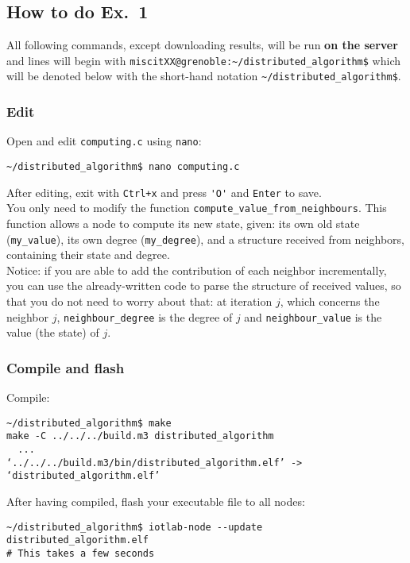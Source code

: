 \documentclass[oneside]{article}
\begin{document}
\subsection{How to do Ex.~1}
All following commands, except downloading results,  will be run \textbf{on the server} and lines will begin with
\verb=miscitXX@grenoble:~/distributed_algorithm$= 
which will be denoted below with the short-hand notation
\verb=~/distributed_algorithm$=.


\subsubsection{Edit} %
Open and edit \verb=computing.c= using \verb=nano=:
\begin{verbatim}~/distributed_algorithm$ nano computing.c \end{verbatim}
After editing, exit with \verb=Ctrl+x= and  press \verb='O'= and \verb=Enter= to save.\\
    

You only need to modify the function \verb=compute_value_from_neighbours=.
This function allows a node to compute its new state, given: 
its own old state (\verb=my_value=),
its own degree (\verb=my_degree=), 
and a structure received from neighbors,
containing their state and degree.\\
Notice: if you are able to add the
contribution of each neighbor incrementally, you can use the
already-written code to parse the structure of received values, so that
you do not need to worry about that: at iteration $j$, which concerns
the neighbor $j$, 
\verb=neighbour_degree= is the degree of $j$ and
\verb=neighbour_value= is the value (the state) of $j$.
    

            
\subsubsection{Compile and flash}

Compile:
    \begin{verbatim}~/distributed_algorithm$ make
make -C ../../../build.m3 distributed_algorithm
  ...
‘../../../build.m3/bin/distributed_algorithm.elf’ -> ‘distributed_algorithm.elf’
\end{verbatim}

After having compiled, flash your executable file to all nodes:
    \begin{verbatim}~/distributed_algorithm$ iotlab-node --update distributed_algorithm.elf
# This takes a few seconds
\end{verbatim}
\end{document}
